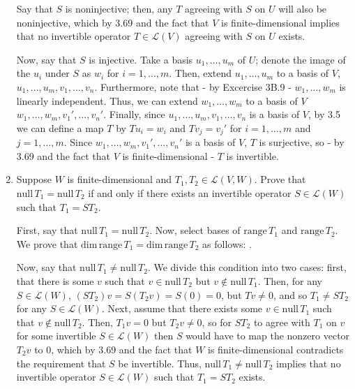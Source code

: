 \documentclass{book}
\begin{document}
\begin{enumerate}
Say that \(S\) is noninjective; then, any \(T\) agreeing with \(S\) on \(U\) will also be noninjective, which by 3.69 and the fact that \(V\) is finite-dimensional implies that no invertible operator \(T \in \mathcal{L}(V)\) agreeing with \(S\) on \(U\) exists.

Now, say that \(S\) is injective.  Take a basis \(u_1,\dots,u_m\) of \(U\); denote the image of the \(u_i\) under \(S\) as \(w_i\) for \(i=1,\dots,m\).  Then, extend \(u_1,\dots,u_m\) to a basis of \(V\), \(u_1,\dots,u_m,v_1,\dots,v_n\).  Furthermore, note that - by Excercise 3B.9 - \(w_1,\dots,w_m\) is linearly independent.  Thus, we can extend \(w_1,\dots,w_m\) to a basis of \(V\) \(w_1,\dots,w_m,v_1',\dots,v_n'\).  Finally, since \(u_1,\dots,u_m,v_1,\dots,v_n\) is a basis of \(V\), by 3.5 we can define a map \(T\) by \(Tu_i=w_i\) and \(Tv_j=v_j'\) for \(i=1,\dots,m\) and \(j=1,\dots,m\).  Since \(w_1,\dots,w_m,v_1',\dots,v_n'\) is a basis of \(V\), \(T\) is surjective, so - by 3.69 and the fact that \(V\) is finite-dimensional - \(T\) is invertible.

\item Suppose \(W\) is finite-dimensional and \(T_1,T_2 \in \mathcal{L}(V,W)\).  Prove that \(\textrm{null} \, T_1 = \textrm{null} \, T_2\) if and only if there exists an invertible operator \(S \in \mathcal{L}(W)\) such that \(T_1=ST_2\).

First, say that \(\textrm{null} \, T_1=\textrm{null} \, T_2\).  Now, select bases of \(\text{range} \, T_1\) and \(\text{range} \, T_2\).  We prove that \(\text{dim} \, \text{range} \, T_1 = \text{dim} \, \text{range} \, T_2\) as follows: .

Now, say that \(\textrm{null} \, T_1 \neq \textrm{null} \, T_2\).  We divide this condition into two cases: first, that there is some \(v\) such that \(v \in \textrm{null} \, T_2\) but \(v \notin \textrm{null} \, T_1\).  Then, for any \(S \in \mathcal{L}(W)\), \((ST_2)v=S(T_2v)=S(0)=0\), but \(Tv \neq 0\), and so \(T_1 \neq ST_2\) for any \(S \in \mathcal{L}(W)\).  Next, assume that there exists some \(v \in \textrm{null} \, T_1\) such that \(v \notin \textrm{null} \, T_2\).  Then, \(T_1v=0\) but \(T_2v \neq 0\), so for \(ST_2\) to agree with \(T_1\) on \(v\) for some invertible \(S \in \mathcal{L}(W)\) then \(S\) would have to map the nonzero vector \(T_2v\) to \(0\), which by 3.69 and the fact that \(W\) is finite-dimensional contradicts the requirement that \(S\) be invertible.  Thus, \(\textrm{null} \, T_1 \neq \textrm{null} \, T_2\) implies that no invertible operator \(S \in \mathcal{L}(W)\) such that \(T_1=ST_2\) exists.


\end{enumerate}
\end{document}
